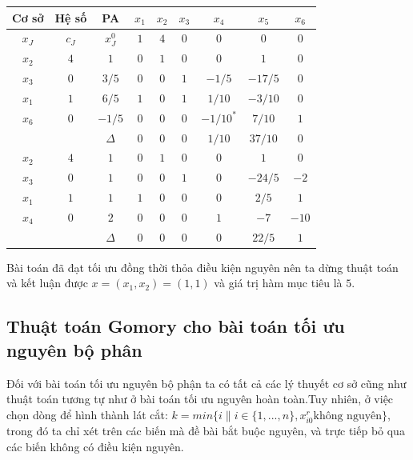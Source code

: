 \documentclass[12pt,a4paper]{report}
\begin{document}
     \begin{center}
         \begin{tabular}{|c|c|c|c|c|c|c|c|c|}
        \hline
         Cơ sở & Hệ số & PA& $x_1$ &$x_2$ &$ x_3$ &$x_4$ &$x_5$ &$x_6$\\
        \hline
        $x_J$ &$c_J$ &$x_J^0$ &$1$ &$4$ &$0$ &$0$ &$0$ &$0$\\
        \hline
        $x_2$ &$4$ &$1$ &$0$ &$1$ &$0$ &$0$ &$1$ &$0$\\
        $x_3$ &$0$ &$3/5$ &$0$ &$0$ &$1$ &$-1/5$ &$-17/5$ & $0$\\
        $x_1$ &$1$ &$6/5$ &$1$ &$0$ &$1$ &$1/10$&$-3/10$ &$0$\\
        $x_6$ &$0$ &$-1/5$ &$0$ &$0$ & $0$ &$-1/10^*$ &$7/10$ &$1$\\
        \hline
        && $\Delta$ &$0$ &$0$ &$0$ &$1/10$ &$37/10$ &$0$\\
        \hline
        $x_2$ &$4$ &$1$ &$0$ &$1$ &$0$ &$0$ &$1$ &$0$\\
        $x_3$ &$0$ &$1$ &$0$ &$0$ &$1$ &$0$ &$-24/5$ &$-2$\\
        $x_1$ &$1$ &$1$ &$1$ &$0$ &$0$ &$0$ &$2/5$ &$1$\\
        $x_4$ &$0$ &$2$ &$0$ &$0$ &$0$ &$1$ &$-7$ &$-10$\\
        \hline
        && $\Delta$ &$0$ &$0$ &$0$ &$0$&$ 22/5$ &$1$\\
        \hline
        
         \end{tabular}
     \end{center}
     Bài toán đã đạt tối ưu đồng thời thỏa điều kiện nguyên nên ta dừng thuật toán và kết luận được $x=(x_1,x_2)=(1,1)$ và giá trị hàm mục tiêu là $5$.
\subsection{Thuật toán Gomory cho bài toán tối ưu nguyên bộ phân}
 Đối với bài toán tối ưu nguyên bộ phận ta có tất cả các lý thuyết cơ sở cũng như thuật toán tương tự như ở bài toán tối ưu nguyên hoàn toàn.Tuy nhiên, ở việc chọn dòng để hình thành lát cắt:
 $k=min\{i\|i\in \{1,...,n\},x_{i0}^r \text{không nguyên}\}$, trong đó ta chỉ xét trên các biến mà đề bài bắt buộc nguyên, và trực tiếp bỏ qua các biến không có điều kiện nguyên.
\end{document}
